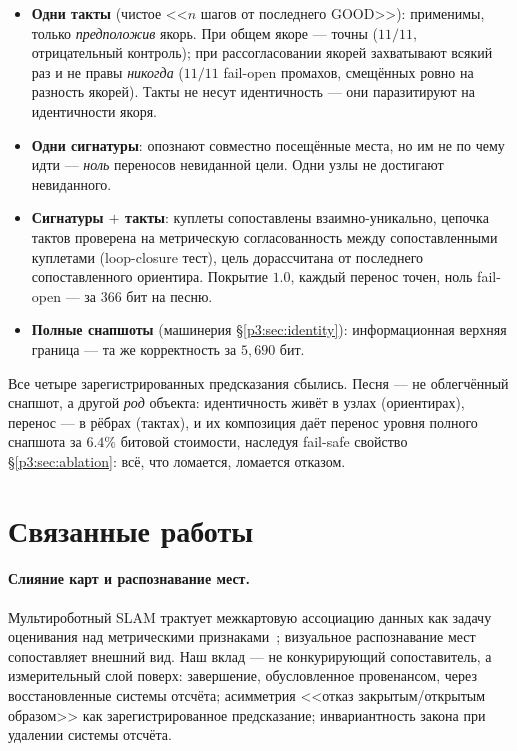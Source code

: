 \documentclass{article}
\begin{document}
\begin{itemize}[leftmargin=16pt,itemsep=2pt,topsep=2pt]
\item \textbf{Одни такты} (чистое <<$n$ шагов от последнего GOOD>>):
  применимы, только \emph{предположив} якорь. При общем якоре ---
  точны ($11/11$, отрицательный контроль); при рассогласовании якорей
  захватывают всякий раз и не правы \emph{никогда} ($11/11$ fail-open
  промахов, смещённых ровно на разность якорей). Такты не несут
  идентичность --- они паразитируют на идентичности якоря.
\item \textbf{Одни сигнатуры}: опознают совместно посещённые места,
  но им не по чему идти --- \emph{ноль} переносов невиданной цели.
  Одни узлы не достигают невиданного.
\item \textbf{Сигнатуры $+$ такты}: куплеты сопоставлены
  взаимно-уникально, цепочка тактов проверена на метрическую
  согласованность между сопоставленными куплетами (loop-closure
  тест), цель дорассчитана от последнего сопоставленного ориентира.
  Покрытие $1.0$, каждый перенос точен, ноль fail-open --- за $366$
  бит на песню.
\item \textbf{Полные снапшоты} (машинерия \S\ref{p3:sec:identity}):
  информационная верхняя граница --- та же корректность за $5{,}690$
  бит.
\end{itemize}

Все четыре зарегистрированных предсказания сбылись. Песня --- не
облегчённый снапшот, а другой \emph{род} объекта: идентичность живёт
в узлах (ориентирах), перенос --- в рёбрах (тактах), и их композиция
даёт перенос уровня полного снапшота за $6.4\%$ битовой стоимости,
наследуя fail-safe свойство \S\ref{p3:sec:ablation}: всё, что ломается,
ломается отказом.

\section{Связанные работы}
\label{p3:sec:related}

\paragraph{Слияние карт и распознавание мест.} Мультироботный SLAM
трактует межкартовую ассоциацию данных как задачу оценивания над
метрическими признаками~\cite{cadena2016slam}; визуальное
распознавание мест~\cite{lowry2016vpr} сопоставляет внешний вид. Наш
вклад --- не конкурирующий сопоставитель, а измерительный слой поверх:
завершение, обусловленное провенансом, через восстановленные системы
отсчёта; асимметрия <<отказ закрытым/открытым образом>> как
зарегистрированное предсказание; инвариантность закона при удалении
системы отсчёта.
\end{document}
